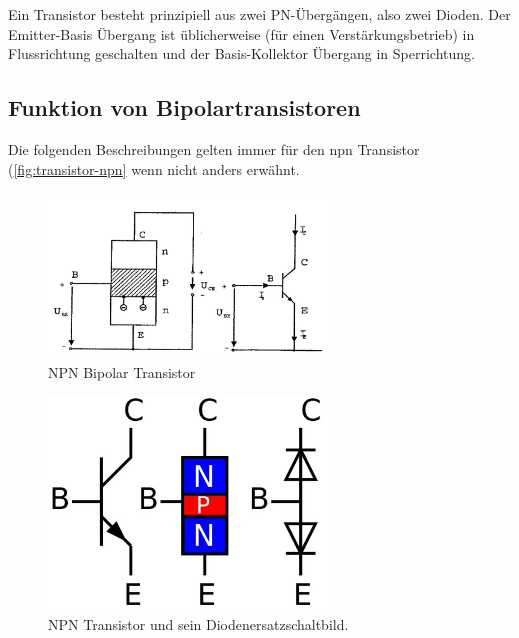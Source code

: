 
Ein Transistor besteht prinzipiell aus zwei PN-Übergängen, also zwei Dioden. 
Der Emitter-Basis Übergang ist üblicherweise (für einen Verstärkungsbetrieb) in Flussrichtung geschalten und der Basis-Kollektor Übergang in Sperrichtung. 

\subsection{Funktion von Bipolartransistoren }\label{k6:bipolar}
Die folgenden Beschreibungen gelten immer für den npn Transistor (\autoref{fig:transistor-npn} wenn nicht anders erwähnt.    
    \begin{figure}
        \centering
        \includegraphics[width=0.66\textwidth]{fig/npn-transistor}
        \caption{NPN Bipolar Transistor}
        \label{fig:transistor-npn}
    \end{figure}
    
    \begin{figure}
        \centering
        \includegraphics[width=0.66\textwidth]{fig/transistor-npn-diode.jpg}
        \caption{NPN Transistor und sein Diodenersatzschaltbild.}
        \label{fig:transistor-npn-diode}
    \end{figure}
    
